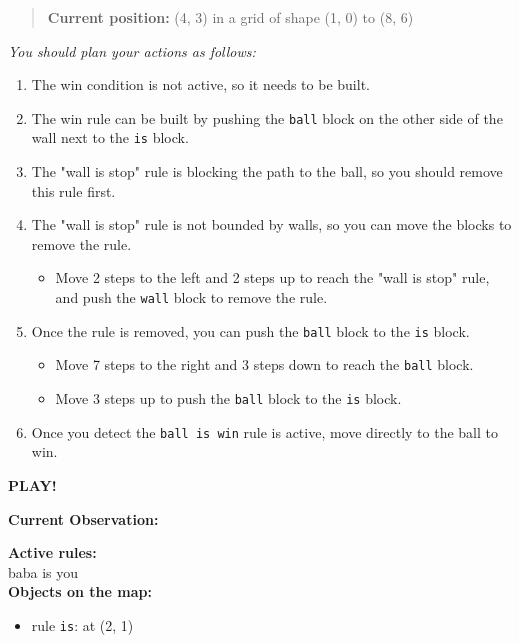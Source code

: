 \begin{GreenBox}
\begin{quote}
		\textbf{Current position:} (4, 3) in a grid of shape (1, 0) to (8, 6)
	\end{quote}

	\textit{You should plan your actions as follows:}
	\begin{enumerate}
		\item The win condition is not active, so it needs to be built.

		\item The win rule can be built by pushing the \texttt{ball} block on the
			other side of the wall next to the \texttt{is} block.

		\item The "wall is stop" rule is blocking the path to the ball, so you
			should remove this rule first.

		\item The "wall is stop" rule is not bounded by walls, so you can move the
			blocks to remove the rule.
			\begin{itemize}
				\item Move 2 steps to the left and 2 steps up to reach the "wall is stop"
					rule, and push the \texttt{wall} block to remove the rule.
			\end{itemize}

		\item Once the rule is removed, you can push the \texttt{ball} block to the \texttt{is}
			block.
			\begin{itemize}
				\item Move 7 steps to the right and 3 steps down to reach the \texttt{ball}
					block.

				\item Move 3 steps up to push the \texttt{ball} block to the \texttt{is}
					block.
			\end{itemize}

		\item Once you detect the \texttt{ball is win} rule is active, move directly
			to the ball to win.
	\end{enumerate}

	\textbf{PLAY!}

	\textbf{Current Observation:}

	\textbf{Active rules:} \\ baba is you \\

	\textbf{Objects on the map:}
	\begin{itemize}
		\item rule \texttt{is}: at (2, 1)


\end{itemize}
\end{GreenBox}
